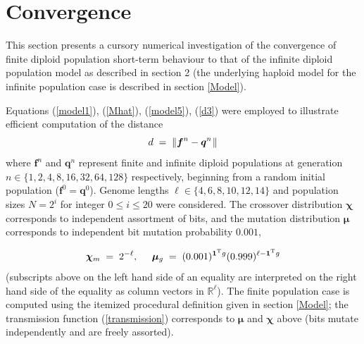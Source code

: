 \section{Convergence}

This section presents a cursory numerical investigation of the
convergence of finite diploid population short-term behaviour to that
of the infinite diploid population model as described in section 2
(the underlying haploid model for the infinite population case is
described in section \ref{Model}).

Equations (\ref{model1}), (\ref{Mhat}),
(\ref{model5}), (\ref{d3}) were employed to illustrate efficient
computation of the distance
\[
d \; = \; \|{\bm f}^n - {\bm q}^n \hspace{0.01in} \|
\]
where ${\bm f}^n$ and ${\bm q}^n$ represent finite and infinite diploid
populations at generation $n \in \{1,2,4,8,16,32,64,128\}$
respectively, beginning from a random initial population (${\bm f}^0 =
{\bm q}^0$). Genome lengths $\ell \in \{4,6,8,10,12,14\}$ and population
sizes $N = 2^i$ for integer $0 \le i \le 20$ were considered.  The
crossover distribution ${\bm \chi}$ corresponds to independent assortment of
bits, and the mutation distribution ${\bm \mu}$ corresponds to independent
bit mutation probability $0.001$,

\[
{\bm \chi}_m \; = \; 2^{-\ell}, \;\;\;\;\; {\bm \mu}_g \; = \; (0.001)^{{\bf 1}^{\rm T}
  g}(0.999)^{\ell - {\bf 1}^{\rm T} g}
\]
(subscripts above on the left hand side of an equality are interpreted
on the right hand side of the equality as column vectors in
$\mathbb{R}^{\ell}$). The finite population case is computed using the
itemized procedural definition given in section \ref{Model}; the transmission
function (\ref{transmission}) corresponds to ${\bm \mu}$ and ${\bm
  \chi}$ above (bits mutate independently and are freely assorted).

